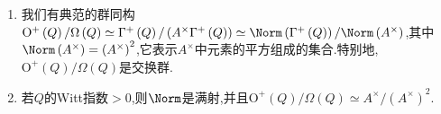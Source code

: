 \begin{proposition}{}{}
	\begin{enumerate}
		\item 我们有典范的群同构$\mathrm{O}^{+}\left(Q\right)/\Omega\left(Q\right)\simeq\Gamma^{+}\left(Q\right)/\left(A^{\times}\Gamma^{+}\left(Q\right)\right)\simeq\Norm\left(\Gamma^{+}\left(Q\right)\right)/\Norm\left(A^{\times}\right)$,其中$\Norm\left(A^{\times}\right)=\left(A^{\times}\right)^{2}$,它表示$A^{\times}$中元素的平方组成的集合.特别地,$\mathrm{O}^{+}\left(Q\right)/\Omega\left(Q\right)$是交换群.
		\item 若$Q$的Witt指数$>0$,则$\Norm$是满射,并且$\mathrm{O}^{+}\left(Q\right)/\Omega\left(Q\right)\simeq A^{\times}/\left(A^{\times}\right)^{2}$.
	\end{enumerate}
\end{proposition}













